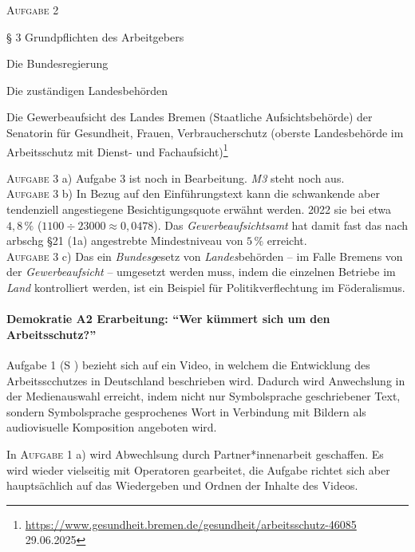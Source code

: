 \textsc{Aufgabe 2} \quad
\begin{myitemize}
    \item § 3 Grundpflichten des Arbeitgebers
    \item Die Bundesregierung
    \item Die zuständigen Landesbehörden
    \item Die Gewerbeaufsicht des Landes Bremen (Staatliche Aufsichtsbehörde) der Senatorin für Gesundheit, Frauen, Verbraucherschutz (oberste Landesbehörde im Arbeitsschutz mit Dienst- und Fachaufsicht)\footnote{\url{https://www.gesundheit.bremen.de/gesundheit/arbeitsschutz-46085} 29.06.2025}
\end{myitemize}


\textsc{Aufgabe 3} a) \quad
Aufgabe 3 ist noch in Bearbeitung. \emph{M3} steht noch aus.
\\

\textsc{Aufgabe 3} b) \quad
In Bezug auf den Einführungstext kann die schwankende aber tendenziell angestiegene Besichtigungsquote erwähnt werden. 2022 sie bei etwa $4,8\,\%$ ($1100 \div 23000 \approx 0,0478$). Das \emph{Gewerbeaufsichtsamt} hat damit fast das nach \gls{arbschg} §21 (1a) angestrebte Mindestniveau von $5\,\%$ erreicht. 
\\

\textsc{Aufgabe 3} c) \quad
Das ein \emph{Bundesg}esetz von \emph{Landes}behörden -- im Falle Bremens von der \emph{Gewerbeaufsicht} -- umgesetzt werden muss, indem die einzelnen Betriebe im \emph{Land} kontrolliert werden, ist ein Beispiel für Politikverflechtung im Föderalismus. 



\paragraph{Demokratie A2 Erarbeitung: \enquote{Wer kümmert sich um den Arbeitsschutz?}}
Aufgabe 1 (\gls{S} \pageref{DEMOKRATIE-A2}) bezieht sich auf ein Video, in welchem die Entwicklung des Arbeitsscchutzes in Deutschland beschrieben wird. 
Dadurch wird Anwechslung in der Medienauswahl erreicht, indem nicht nur Symbolsprache geschriebener Text, sondern Symbolsprache gesprochenes Wort in Verbindung mit Bildern als audiovisuelle Komposition angeboten wird.


In \textsc{Aufgabe 1} a) wird Abwechlsung durch Partner*innenarbeit geschaffen.
Es wird wieder vielseitig mit Operatoren gearbeitet, die Aufgabe richtet sich aber hauptsächlich auf das Wiedergeben und Ordnen der Inhalte des Videos.

